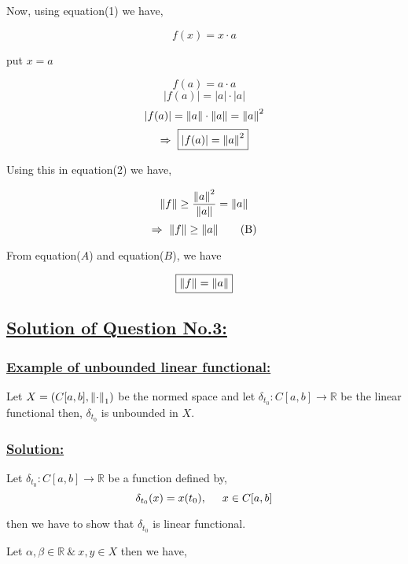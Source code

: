 \documentclass[a4paper,12pt]{article}
\begin{document}
    Now, using equation(1) we have,

    \begin{center}
        \[f(x) =x\cdot a\]

        put $x = a$

        \[f(a) = a\cdot a\]
        \[|f(a)| = |a|\cdot |a|\]
        \[|f(a)| = \norm{a}\cdot \norm{a} = \norm{a}^2\]
        \[\Rightarrow\ \boxed{|f(a)| = \norm{a}^2}\]
    \end{center}

    Using this in equation(2) we have,

    \[\norm{f} \geq \frac{\norm{a}^2}{\norm{a}} = \norm{a}\]
    \begin{equation}
        \Rightarrow\ \norm{f} \geq \norm{a} \tag*{(B)}
    \end{equation}

    From equation($A$) and equation($B$), we have

    \[\boxed{\norm{f} = \norm{a}}\]

    \vspace*{0.0cm}


    \subsection*{\underline{Solution of Question No.3:}}

    \subsubsection*{\underline{Example of unbounded linear functional:}}

    Let $X = \left(C[a,b], \norm{\cdot}_1\right)$ be the normed space and let $\delta_{t_0} : C[a,b]\to \mathbb{R}$ be the linear functional then, $\delta_{t_0}$ is unbounded in $X$.

    \subsubsection*{\underline{Solution:}}

    Let $\delta_{t_0} : C[a,b]\to \mathbb{R}$ be a function defined by, 
    \[\delta_{t_0}(x) = x(t_0), \hspace*{0.5cm} x\in C[a,b]\]

    then we have to show that $\delta_{t_0}$ is linear functional.

    Let $\alpha, \beta\in \mathbb{R}\ \&\ x,y\in X$ then we have,
\end{document}
